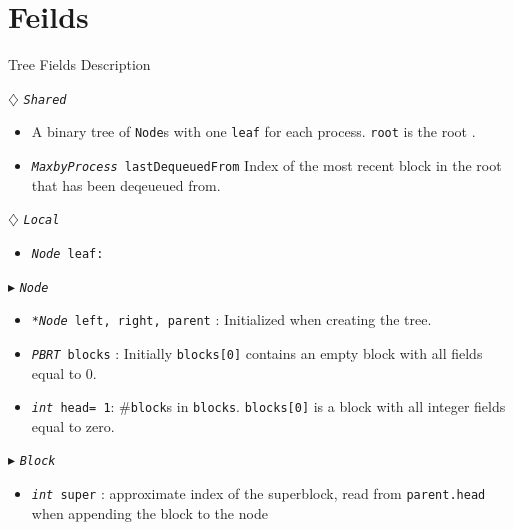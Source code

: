 \documentclass{article}
\renewcommand{\tt}[1]{\texttt{#1}}
\renewcommand{\sl}[1]{\textsl{#1}}
\newcommand{\nf}[1]{{\normalfont{\texttt{#1}}}}
\newcommand{\head}{head}
\theoremstyle{definition}
\begin{document}
\section{Feilds}
\begin{algorithm}
\caption{Tree Fields Description}
\begin{algorithmic}[1]
\setcounter{ALG@line}{1}


\Statex $\diamondsuit$ \tt{\sl{Shared}}
\begin{itemize}
\item \textsf{A binary tree of \tt{Node}s with one \tt{leaf} for each process. \tt{root} is the root \nf{node}.}
\item {\color{red}\tt{\sl{MaxbyProcess} lastDequeuedFrom} \textsf{Index of the most recent block in the root that has been deqeueued from.}}
\end{itemize}

\Statex $\diamondsuit$ \tt{\sl{Local}}
\begin{itemize}
\item \tt{\sl{Node} leaf:} 
\end{itemize}

\Statex $\blacktriangleright$ \tt{\sl{Node}}
\begin{itemize}
\item \tt{\sl{*Node} left, right, parent} \textsf{: Initialized  when creating the tree.}
\item {\color{red}\tt{\sl{PBRT} blocks} \textsf{: Initially \tt{blocks[0]} contains an empty block with all fields equal to 0.}}
\item \tt{\sl{int} \head= 1}\textsf{: \#\tt{block}s in \tt{blocks}. \tt{blocks[0]} is a block with all integer fields equal to zero.}
\end{itemize}

\Statex $\blacktriangleright$ \tt{\sl{Block}} 

\begin{itemize}
  \item \tt{\sl{int} super}
  \textsf{: approximate index of the superblock, read from \tt{parent.head} when appending the block to the node}
\end{itemize}




\end{algorithmic}
\end{algorithm}
\end{document}
